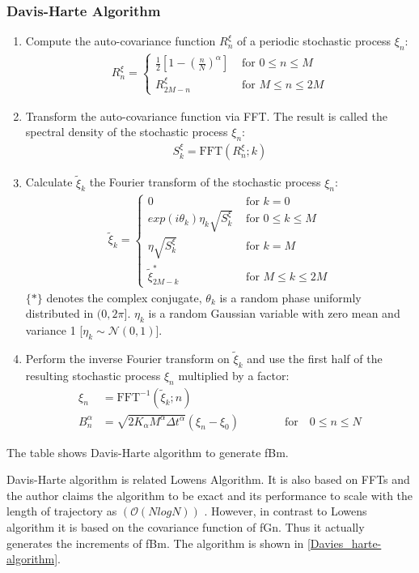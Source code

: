 \documentclass[
  a4paper,BCOR10mm,oneside,
  headsepline,footsepline,%
  fleqn,openbib
]{scrbook}
\begin{document}
\subsubsection{Davis-Harte Algorithm}
\begin{table}[h]
 \begin{framed}
\begin{enumerate}
 \item Compute the auto-covariance function $R^{\xi}_n$ of a periodic stochastic process $\xi_n$:
 \begin{align}
  R^{\xi}_n=
  \begin{cases}
   \frac{1}{2}\left[1-\left(\frac{n}{N}\right)^{\alpha} \right]  & \text{ for    } 0 \leq n \leq M \\
   R^{\xi}_{2M-n}  & \text{ for    } M \leq n \leq 2M 
  \end{cases}
 \end{align}
 \item Transform the auto-covariance function via FFT. The result is called the spectral density of the stochastic process $\xi_n$:
  \begin{align}
   S^{\xi}_k= \mathrm{FFT}(R^{\xi}_n;k)
  \end{align}
 \item Calculate $\tilde\xi_k$ the Fourier transform of the stochastic process $\xi_n$:
 \begin{align}
  \tilde\xi_k=
  \begin{cases}
     0  & \text{ for    } k=0 \\    
     exp(i \theta_k) \eta_k \sqrt{S^{\xi}_k}  & \text{ for    } 0 \leq k \leq M \\
     \eta \sqrt{S^{\xi}_k}  & \text{ for    } k = M \\
     \tilde\xi^{*}_{2M-k} & \text{ for    } M \leq k \leq 2M 
  \end{cases}
 \end{align}
 $\{*\}$ denotes the complex conjugate, $\theta_k$ is a random phase uniformly distributed  in $(0,2\pi]$. $\eta_k$ is a random Gaussian variable with zero mean and variance 1 [$\eta_k\sim \mathcal{N}(0,1)$].  
 \item Perform the inverse Fourier transform on $\tilde\xi_k$ and use the first half of the resulting stochastic process $\xi_n$ multiplied by a factor:
 \begin{align}
  \xi_n&=\mathrm{FFT}^{-1}(\tilde\xi_k;n) \\
  B^{\alpha}_n&=  \sqrt{2 K_{\alpha} M^{\alpha} \Delta t^{\alpha}} (\xi_n- \xi_0)  \qquad \qquad \text{for} \quad 0 \leq n \leq N
 \end{align}
\end{enumerate}
\end{framed}
\label{Davies_harte-algorithm}
\caption{The table shows Davis-Harte algorithm \cite{DAVIES1987} to generate fBm.}
\end{table}
Davis-Harte algorithm is related Lowens Algorithm. It is also based on FFTs and the author claims the algorithm to be exact and its performance to scale with the length of trajectory as $(\mathcal{O}(NlogN))$ . However, in contrast to Lowens algorithm it is based on the covariance function of fGn. Thus it actually generates the increments of fBm. The  algorithm is shown in \cref{Davies_harte-algorithm}. 
\end{document}
